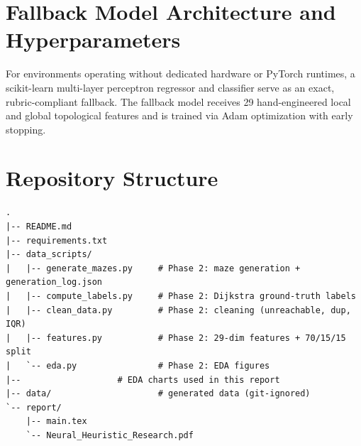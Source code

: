 \documentclass[11pt]{article}
\begin{document}
\section{Fallback Model Architecture and Hyperparameters}
\label{app:fallback}
For environments operating without dedicated hardware or PyTorch runtimes, a scikit-learn
multi-layer perceptron regressor and classifier serve as an exact, rubric-compliant fallback.
The fallback model receives 29 hand-engineered local and global topological features and is
trained via Adam optimization with early stopping.


\section{Repository Structure}
\begin{verbatim}
.
|-- README.md
|-- requirements.txt
|-- data_scripts/
|   |-- generate_mazes.py     # Phase 2: maze generation + generation_log.json
|   |-- compute_labels.py     # Phase 2: Dijkstra ground-truth labels
|   |-- clean_data.py         # Phase 2: cleaning (unreachable, dup, IQR)
|   |-- features.py           # Phase 2: 29-dim features + 70/15/15 split
|   `-- eda.py                # Phase 2: EDA figures
|--                   # EDA charts used in this report
|-- data/                     # generated data (git-ignored)
`-- report/
    |-- main.tex
    `-- Neural_Heuristic_Research.pdf
\end{verbatim}
\end{document}
